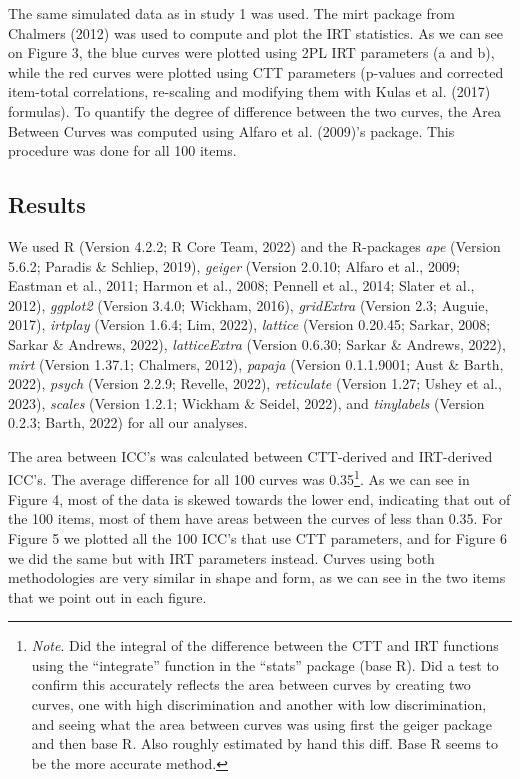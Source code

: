 \documentclass[
  man]{apa6}
\begin{document}
The same simulated data as in study 1 was used. The mirt package from Chalmers (2012) was used to compute and plot the IRT statistics. As we can see on Figure 3, the blue curves were plotted using 2PL IRT parameters (a and b), while the red curves were plotted using CTT parameters (p-values and corrected item-total correlations, re-scaling and modifying them with Kulas et al. (2017) formulas). To quantify the degree of difference between the two curves, the Area Between Curves was computed using Alfaro et al. (2009)'s package. This procedure was done for all 100 items.

\hypertarget{results-1}{%
\subsection{Results}\label{results-1}}

We used R (Version 4.2.2; R Core Team, 2022) and the R-packages \emph{ape} (Version 5.6.2; Paradis \& Schliep, 2019), \emph{geiger} (Version 2.0.10; Alfaro et al., 2009; Eastman et al., 2011; Harmon et al., 2008; Pennell et al., 2014; Slater et al., 2012), \emph{ggplot2} (Version 3.4.0; Wickham, 2016), \emph{gridExtra} (Version 2.3; Auguie, 2017), \emph{irtplay} (Version 1.6.4; Lim, 2022), \emph{lattice} (Version 0.20.45; Sarkar, 2008; Sarkar \& Andrews, 2022), \emph{latticeExtra} (Version 0.6.30; Sarkar \& Andrews, 2022), \emph{mirt} (Version 1.37.1; Chalmers, 2012), \emph{papaja} (Version 0.1.1.9001; Aust \& Barth, 2022), \emph{psych} (Version 2.2.9; Revelle, 2022), \emph{reticulate} (Version 1.27; Ushey et al., 2023), \emph{scales} (Version 1.2.1; Wickham \& Seidel, 2022), and \emph{tinylabels} (Version 0.2.3; Barth, 2022) for all our analyses.

The area between ICC's was calculated between CTT-derived and IRT-derived ICC's. The average difference for all 100 curves was 0.35\footnote{\emph{Note}. Did the integral of the difference between the CTT and IRT functions using the ``integrate'' function in the ``stats'' package (base R). Did a test to confirm this accurately reflects the area between curves by creating two curves, one with high discrimination and another with low discrimination, and seeing what the area between curves was using first the geiger package and then base R. Also roughly estimated by hand this diff. Base R seems to be the more accurate method.}. As we can see in Figure 4, most of the data is skewed towards the lower end, indicating that out of the 100 items, most of them have areas between the curves of less than 0.35.
For Figure 5 we plotted all the 100 ICC's that use CTT parameters, and for Figure 6 we did the same but with IRT parameters instead. Curves using both methodologies are very similar in shape and form, as we can see in the two items that we point out in each figure.
\end{document}
